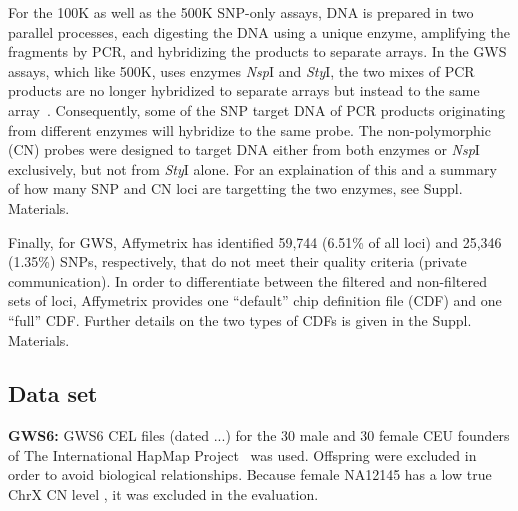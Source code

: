 \documentclass{bioinfo}
\newcommand{\GWS}{GWS\xspace}
\newcommand{\GWSFive}{GWS5\xspace}
\newcommand{\GWSSix}{GWS6\xspace}
\newcommand{\chrX}{ChrX\xspace}
\newcommand{\NspI}{\emph{Nsp}I\xspace}
\newcommand{\StyI}{\emph{Sty}I\xspace}
\begin{document}
For the 100K as well as the 500K SNP-only assays, DNA is prepared in two parallel processes, each digesting the DNA using a unique enzyme, amplifying the fragments by PCR, and hybridizing the products to separate arrays.  In the GWS assays, which like 500K, uses enzymes \NspI and \StyI, the two mixes of PCR products are no longer hybridized to separate arrays but instead to the same array~\citep{Affymetrix_2007f, Affymetrix_2007g}.
Consequently, some of the SNP target DNA of PCR products originating from different enzymes will hybridize to the same probe.  
The non-polymorphic (CN) probes were designed to target DNA either from both enzymes or \NspI exclusively, but not from \StyI alone.  
For an explaination of this and a summary of how many SNP and CN loci are targetting the two enzymes, see Suppl. Materials.


Finally, for \GWS, Affymetrix has identified 59,744 (6.51\% of all loci) and 25,346 (1.35\%) SNPs, respectively, that do not meet their quality criteria (private communication).
In order to differentiate between the filtered and non-filtered sets of loci, Affymetrix provides one ``default'' chip definition file (CDF) and one ``full'' CDF.  Further details on the two types of CDFs is given in the Suppl. Materials.






\subsection{Data set}
\textbf{\GWSSix:} \GWSSix CEL files (dated ...) for the 30 male and 30 female CEU founders of The International HapMap Project~\citep{HapMap_2003, AltshulerD_etal_2005} was used. Offspring were excluded in order to avoid biological relationships.
Because female NA12145 has a low true \chrX CN level \citep{TingJ_etal_2006}, it was excluded in the evaluation.  
\end{document}

